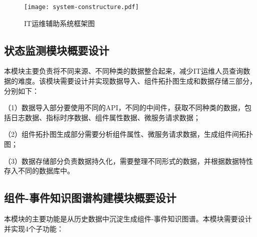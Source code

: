 \begin{figure}[htbp]
    \centering
    \texttt{[image: system-constructure.pdf]}
    \caption{IT运维辅助系统框架图\label{system-constructure}}
\end{figure}

\subsection{状态监测模块概要设计}
本模块主要负责将不同来源、不同种类的数据整合起来，减少IT运维人员查询数据的难度。该模块需要设计并实现数据导入、组件拓扑图生成和数据存储三部分，分别如下：

（1）数据导入部分要使用不同的API，不同的中间件，获取不同种类的数据，包括日志数据、指标时序数据、组件属性数据、微服务请求数据；

（2）组件拓扑图生成部分需要分析组件属性、微服务请求数据，生成组件间拓扑图；

（3）数据存储部分负责数据持久化，需要整理不同形式的数据，并根据数据特性存入不同的数据库中。

\subsection{组件-事件知识图谱构建模块概要设计}
本模块的主要功能是从历史数据中沉淀生成组件-事件知识图谱。本模块需要设计并实现4个子功能：

